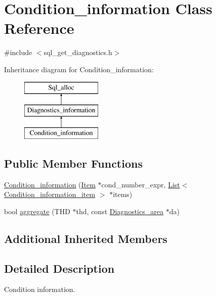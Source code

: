 \hypertarget{classCondition__information}{}\section{Condition\+\_\+information Class Reference}
\label{classCondition__information}


{\ttfamily \#include $<$sql\+\_\+get\+\_\+diagnostics.\+h$>$}

Inheritance diagram for Condition\+\_\+information\+:\begin{figure}[H]
\begin{center}
\leavevmode
\includegraphics[height=3.000000cm]{classCondition__information}
\end{center}
\end{figure}
\subsection*{Public Member Functions}
\begin{DoxyCompactItemize}
\item 
\mbox{\hyperlink{classCondition__information_a5e3aea823731ffd6403d6279c45b6d04}{Condition\+\_\+information}} (\mbox{\hyperlink{classItem}{Item}} $\ast$cond\+\_\+number\+\_\+expr, \mbox{\hyperlink{classList}{List}}$<$ \mbox{\hyperlink{classCondition__information__item}{Condition\+\_\+information\+\_\+item}} $>$ $\ast$items)
\item 
bool \mbox{\hyperlink{classCondition__information_acb021776f86470bf0ca0da8a3f60c44a}{aggregate}} (T\+HD $\ast$thd, const \mbox{\hyperlink{classDiagnostics__area}{Diagnostics\+\_\+area}} $\ast$da)
\end{DoxyCompactItemize}
\subsection*{Additional Inherited Members}


\subsection{Detailed Description}
Condition information.

